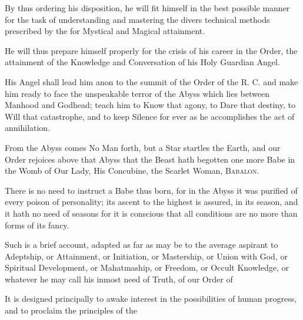 By thus ordering his disposition, he will fit himself in the best possible manner for the task of understanding and mastering the divers technical methods prescribed by the \Argentium{} for Mystical and Magical attainment.

He will thus prepare himself properly for the crisis of his career in the Order, the attainment of the Knowledge and Conversation of his Holy Guardian Angel.

His Angel shall lead him anon to the summit of the Order of the R. C. and make him ready to face the unspeakable terror of the Abyss which lies between Manhood and Godhead; teach him to Know that agony, to Dare that destiny, to Will that catastrophe, and to keep Silence for ever as he accomplishes the act of annihilation.

From the Abyss comes No Man forth, but a Star startles the Earth, and our Order rejoices above that Abyss that the Beast hath begotten one more Babe in the Womb of Our Lady, His Concubine, the Scarlet Woman, \textsc{Babalon}.

There is no need to instruct a Babe thus born, for in the Abyss it was purified of every poison of personality; its ascent to the highest is assured, in its season, and it hath no need of seasons for it is conscious that all conditions are no more than forms of its fancy.

Such is a brief account, adapted as far as may be to the average aspirant to Adeptship, or Attainment, or Initiation, or Mastership, or Union with God, or Spiritual Development, or Mahatmaship, or Freedom, or Occult Knowledge, or whatever he may call his inmost need of Truth, of our Order of \Argentium{}

It is designed principally to awake interest in the possibilities of human progress, and to proclaim the principles of the \Argentium{}

